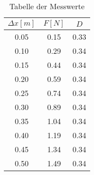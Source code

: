 \documentclass[captions=tableheading]{scrartcl}
\begin{document}
\begin{table}
    \centering
    \caption{Tabelle der Messwerte}
    \label{tab:some_data}
    \begin{tabular}{c c c}
        \toprule
        $\Delta x [m]$ & $F [N]$ & $D$\\
        \midrule
        0.05 & 0.15 & 0.33 \\
        0.10 & 0.29 & 0.34 \\
        0.15 & 0.44 & 0.34 \\
        0.20 & 0.59 & 0.34 \\
        0.25 & 0.74 & 0.34 \\
        0.30 & 0.89 & 0.34 \\
        0.35 & 1.04 & 0.34 \\
        0.40 & 1.19 & 0.34 \\
        0.45 & 1.34 & 0.34 \\
        0.50 & 1.49 & 0.34 \\
        \bottomrule
    \end{tabular}
\end{table}


\end{document}
